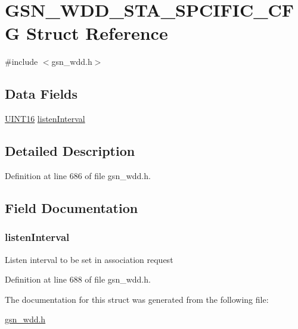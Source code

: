\hypertarget{a00300}{
\section{GSN\_\-WDD\_\-STA\_\-SPCIFIC\_\-CFG Struct Reference}
\label{a00300}
}


{\ttfamily \#include $<$gsn\_\-wdd.h$>$}

\subsection*{Data Fields}
\begin{DoxyCompactItemize}
\item 
\hyperlink{a00660_ga09f1a1fb2293e33483cc8d44aefb1eb1}{UINT16} \hyperlink{a00300_a6429fe517dc48f11feaf8351ddf5c934}{listenInterval}
\end{DoxyCompactItemize}


\subsection{Detailed Description}


Definition at line 686 of file gsn\_\-wdd.h.



\subsection{Field Documentation}
\hypertarget{a00300_a6429fe517dc48f11feaf8351ddf5c934}{
\subsubsection[{listenInterval}]{ {\bf listenInterval}}}
\label{a00300_a6429fe517dc48f11feaf8351ddf5c934}
Listen interval to be set in association request 

Definition at line 688 of file gsn\_\-wdd.h.



The documentation for this struct was generated from the following file:\begin{DoxyCompactItemize}
\item 
\hyperlink{a00603}{gsn\_\-wdd.h}\end{DoxyCompactItemize}
